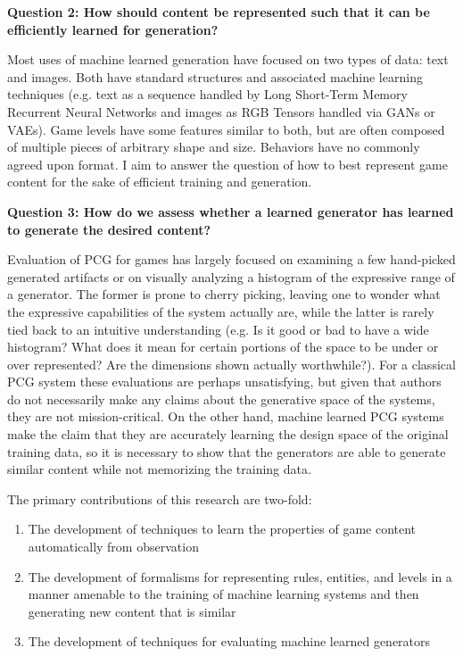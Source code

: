 \documentclass[a4paper]{article}
\begin{document}
\textbf{Question 2: How should content be represented such that it can be efficiently learned for generation?}

Most uses of machine learned generation have focused on two types of data: text and images.  Both have standard structures and associated machine learning techniques (e.g. text as a sequence handled by Long Short-Term Memory Recurrent Neural Networks and images as RGB Tensors handled via GANs or VAEs).  Game levels have some features similar to both, but are often composed of multiple pieces of arbitrary shape and size.  Behaviors have no commonly agreed upon format.  I aim to answer the question of how to best represent game content for the sake of efficient training and generation.

\textbf{Question 3: How do we assess whether a learned generator has learned to generate the desired content?}

Evaluation of PCG for games has largely focused on examining a few hand-picked generated artifacts or on visually analyzing a histogram of the expressive range of a generator.  The former is prone to cherry picking, leaving one to wonder what the expressive capabilities of the system actually are, while the latter is rarely tied back to an intuitive understanding (e.g. Is it good or bad to have a wide histogram? What does it mean for certain portions of the space to be under or over represented? Are the dimensions shown actually worthwhile?).  For a classical PCG system these evaluations are perhaps unsatisfying, but given that authors do not necessarily make any claims about the generative space of the systems, they are not mission-critical.  On the other hand, machine learned PCG systems make the claim that they are accurately learning the design space of the original training data, so it is necessary to show that the generators are able to generate similar content while not memorizing the training data.




The primary contributions of this research are two-fold:
\begin{enumerate}
\item The development of techniques to learn the properties of game content automatically from observation
\item The development of formalisms for representing rules, entities, and levels in a manner amenable to the training of machine learning systems and then generating new content that is similar
\item The development of techniques for evaluating machine learned generators
\end{enumerate}
\end{document}
